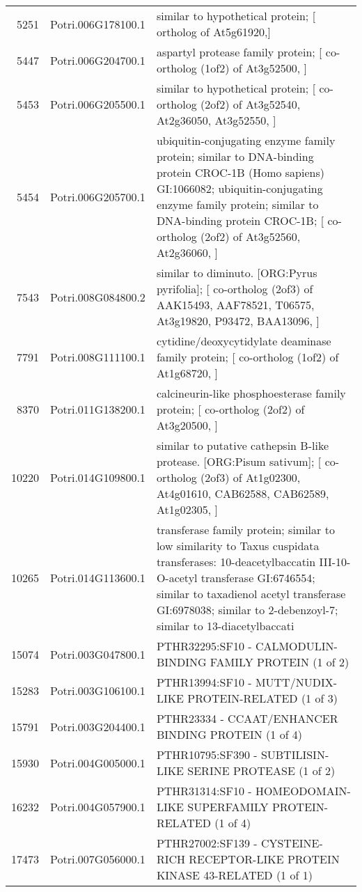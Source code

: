 \begin{table}[ht]
\begin{tabular}{rll}
  5251 & Potri.006G178100.1 & similar to hypothetical protein; [ ortholog of At5g61920,] \\ 
  5447 & Potri.006G204700.1 & aspartyl protease family protein; [ co-ortholog (1of2) of At3g52500, ] \\ 
  5453 & Potri.006G205500.1 & similar to hypothetical protein; [ co-ortholog (2of2) of At3g52540, At2g36050, At3g52550, ] \\ 
  5454 & Potri.006G205700.1 & ubiquitin-conjugating enzyme family protein; similar to DNA-binding protein CROC-1B (Homo sapiens) GI:1066082; ubiquitin-conjugating enzyme family protein; similar to DNA-binding protein CROC-1B; [ co-ortholog (2of2) of At3g52560, At2g36060, ] \\ 
  7543 & Potri.008G084800.2 & similar to diminuto. [ORG:Pyrus pyrifolia]; [ co-ortholog (2of3) of AAK15493, AAF78521, T06575, At3g19820, P93472, BAA13096, ] \\ 
  7791 & Potri.008G111100.1 & cytidine/deoxycytidylate deaminase family protein; [ co-ortholog (1of2) of At1g68720, ] \\ 
  8370 & Potri.011G138200.1 & calcineurin-like phosphoesterase family protein; [ co-ortholog (2of2) of At3g20500, ] \\ 
  10220 & Potri.014G109800.1 & similar to putative cathepsin B-like protease. [ORG:Pisum sativum]; [ co-ortholog (2of3) of At1g02300, At4g01610, CAB62588, CAB62589, At1g02305, ] \\ 
  10265 & Potri.014G113600.1 & transferase family protein; similar to low similarity to Taxus cuspidata transferases: 10-deacetylbaccatin III-10-O-acetyl transferase GI:6746554; similar to taxadienol acetyl transferase GI:6978038; similar to 2-debenzoyl-7; similar to 13-diacetylbaccati \\ 
  15074 & Potri.003G047800.1 & PTHR32295:SF10 - CALMODULIN-BINDING FAMILY PROTEIN (1 of 2) \\ 
  15283 & Potri.003G106100.1 & PTHR13994:SF10 - MUTT/NUDIX-LIKE PROTEIN-RELATED (1 of 3) \\ 
  15791 & Potri.003G204400.1 & PTHR23334 - CCAAT/ENHANCER BINDING PROTEIN (1 of 4) \\ 
  15930 & Potri.004G005000.1 & PTHR10795:SF390 - SUBTILISIN-LIKE SERINE PROTEASE (1 of 2) \\ 
  16232 & Potri.004G057900.1 & PTHR31314:SF10 - HOMEODOMAIN-LIKE SUPERFAMILY PROTEIN-RELATED (1 of 4) \\ 
  17473 & Potri.007G056000.1 & PTHR27002:SF139 - CYSTEINE-RICH RECEPTOR-LIKE PROTEIN KINASE 43-RELATED (1 of 1) \\ 

\end{tabular}
\end{table}
